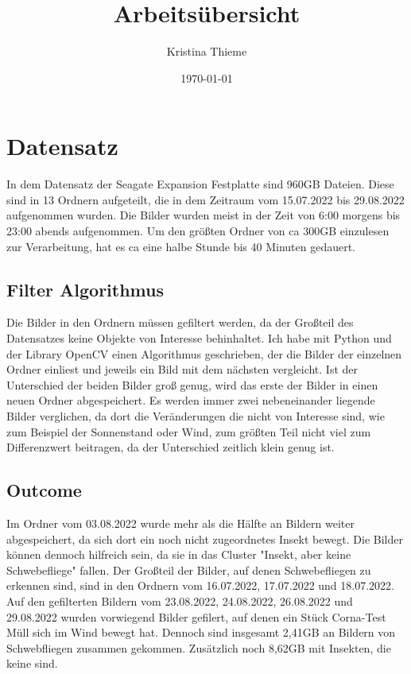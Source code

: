 \documentclass[11pt]{scrartcl}
\title{Arbeitsübersicht}
\author{Kristina Thieme}
\date{\today{}}
\begin{document}
\maketitle

\section{Datensatz}

In dem Datensatz der Seagate Expansion Festplatte sind 960GB Dateien. Diese sind in 13 Ordnern aufgeteilt, die in dem Zeitraum vom
15.07.2022 bis 29.08.2022 aufgenommen wurden. Die Bilder wurden meist in der Zeit von 6:00 morgens bis 23:00 abends aufgenommen. 
Um den größten Ordner von ca 300GB einzulesen zur Verarbeitung, hat es ca eine halbe Stunde bis 40 Minuten gedauert.


\subsection{Filter Algorithmus}

Die Bilder in den Ordnern müssen gefiltert werden, da der Großteil des Datensatzes keine Objekte von Interesse behinhaltet. 
Ich habe mit Python und der Library OpenCV einen Algorithmus geschrieben, der die Bilder der einzelnen Ordner einliest und jeweils 
ein Bild mit dem nächsten vergleicht. Ist der Unterschied der beiden Bilder groß genug, wird das erste der Bilder in einen neuen
Ordner abgespeichert. Es werden immer zwei nebeneinander liegende Bilder verglichen, da dort die Veränderungen die nicht von Interesse sind,
wie zum Beispiel der Sonnenstand oder Wind, zum größten Teil nicht viel zum Differenzwert beitragen, da der Unterschied zeitlich klein
genug ist. 

\subsection{Outcome}

Im Ordner vom 03.08.2022 wurde mehr als die Hälfte an Bildern weiter abgespeichert, da sich dort ein noch nicht zugeordnetes Insekt
bewegt. Die Bilder können dennoch hilfreich sein, da sie in das Cluster "Insekt, aber keine Schwebefliege" fallen. Der Großteil der Bilder,
auf denen Schwebefliegen zu erkennen sind, sind in den Ordnern vom 16.07.2022, 17.07.2022 und 18.07.2022. Auf den gefilterten Bildern vom 
23.08.2022, 24.08.2022, 26.08.2022 und 29.08.2022 wurden vorwiegend Bilder gefilert, auf denen ein Stück Corna-Test Müll sich im 
Wind bewegt hat. Dennoch sind insgesamt 2,41GB an Bildern von Schwebfliegen zusammen gekommen. Zusätzlich noch 8,62GB mit Insekten, die keine sind.
\end{document}
